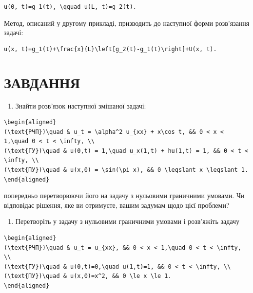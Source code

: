 \documentclass[
  ukrainian,
]{article}
\providecommand{\tightlist}{%
  \setlength{\itemsep}{0pt}\setlength{\parskip}{0pt}}
\begin{document}
\begin{verbatim}
u(0, t)=g_1(t), \qquad u(L, t)=g_2(t).
\end{verbatim}

Метод, описаний у другому прикладі, призводить до наступної форми
розв'язання задачі:

\begin{verbatim}
u(x, t)=g_1(t)+\frac{x}{L}\left[g_2(t)-g_1(t)\right]+U(x, t).
\end{verbatim}

\section{ЗАВДАННЯ}\label{ux437ux430ux432ux434ux430ux43dux43dux44f-2}

\begin{enumerate}
\def\labelenumi{\arabic{enumi}.}
\tightlist
\item
  Знайти розв'язок наступної змішаної задачі:
\end{enumerate}

\begin{verbatim}
\begin{aligned}
(\text{РЧП})\quad & u_t = \alpha^2 u_{xx} + x\cos t, && 0 < x < 1,\quad 0 < t < \infty, \\
(\text{ГУ})\quad & u(0,t) = 1,\quad u_x(1,t) + hu(1,t) = 1, && 0 < t < \infty, \\
(\text{ПУ})\quad & u(x,0) = \sin(\pi x), && 0 \leqslant x \leqslant 1.
\end{aligned}
\end{verbatim}

попередньо перетворюючи його на задачу з нульовими граничними умовами.
Чи відповідає рішення, яке ви отримуєте, вашим задумам щодо цієї
проблеми?

\begin{enumerate}
\def\labelenumi{\arabic{enumi}.}
\setcounter{enumi}{1}
\tightlist
\item
  Перетворіть у задачу з нульовими граничними умовами і розв'яжіть
  задачу
\end{enumerate}

\begin{verbatim}
\begin{aligned}
(\text{РЧП})\quad & u_t = u_{xx}, && 0 < x < 1,\quad 0 < t < \infty, \\
(\text{ГУ})\quad & u(0,t)=0,\quad u(1,t)=1, && 0 < t < \infty, \\
(\text{ПУ})\quad & u(x,0)=x^2, && 0 \le x \le 1.
\end{aligned}
\end{verbatim}
\end{document}
